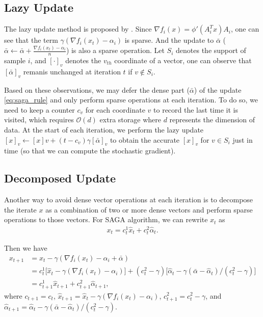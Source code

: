 \documentclass{article}
\begin{document}
\subsection{Lazy Update}
The lazy update method is proposed by \cite{schmidt2017}. Since $\nabla f_i(x) = \phi'(A_i^T x) A_i$, one can see that the term $\gamma (\nabla f_i(x_t) - \alpha_i)$ is sparse. And the update to $\bar{\alpha}$ ($\bar{\alpha} \leftarrow \bar{\alpha} + \frac{\nabla f_i(x_t) - \alpha_i}{n}$) is also a sparse operation. Let $S_i$ denotes the support of sample $i$, and $[\cdot]_v$ denotes the $v_{th}$ coordinate of a vector, one can observe that $[\bar{\alpha}]_v$ remanis unchanged at iteration $t$ if $v \notin S_i$.

\bigbreak

Based on these observations, we may defer
the dense part ($\bar{\alpha}$) of the update \eqref{eq:saga_rule} and only perform sparse operations at each iteration.
To do so, we need to keep a counter $c_v$ for each coordinate $v$ to record the last time it is visited, which requires $\mathcal{O}(d)$ extra storage where $d$ represents the dimension of data. At the start of each iteration, we perform the lazy update $[x]_v \leftarrow [x]v + (t - c_v) \gamma [\bar{\alpha}]_v$ to obtain the accurate $[x]_v$ for $v \in S_i$ just in time (so that we can compute the stochastic gradient).

\subsection{Decomposed Update}
Another way to avoid dense vector operations at each iteration is to decompose the iterate $x$ as a combination of two or more dense vectors and perform sparse operations to those vectors. For SAGA algorithm, we can rewrite $x_t$ as
\begin{equation}
\begin{aligned}
    x_t = c_t^1 \hat{x}_t + c_t^2 \hat{\alpha}_t.
\end{aligned}
\end{equation}

Then we have
\begin{equation}
\begin{aligned}
    x_{t+1} &= x_t - \gamma (\nabla f_i(x_t) - \alpha_i + \bar{\alpha})  \\
            &= c_t^1 \big[ \hat{x}_t - \gamma (\nabla f_i(x_t) - \alpha_i) \big] + (c_t^2 - \gamma) \big[ \hat{\alpha}_t - \gamma (\bar{\alpha} - \hat{\alpha}_t) / (c_t^2 - \gamma) \big] \\
            &= c_{t+1}^1 \hat{x}_{t+1} + c_{t+1}^2 \hat{\alpha}_{t+1},
\end{aligned}
\end{equation}
where $c_{t+1} = c_{t}$, $\hat{x}_{t+1} = \hat{x}_t - \gamma (\nabla f_i(x_t) - \alpha_i)$, $c_{t+1}^2 = c_t^2 - \gamma$, and $\hat{\alpha}_{t+1} = \hat{\alpha}_t - \gamma (\bar{\alpha} - \hat{\alpha}_t) / (c_t^2 - \gamma)$.
\end{document}
